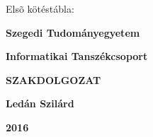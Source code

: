 \documentclass[12pt]{report}
\begin{document}
\thispagestyle{empty}
Elsõ kötéstábla:

\begin{center}
{\Large\bf Szegedi Tudományegyetem}

\vspace{0.5cm}

{\Large\bf Informatikai Tanszékcsoport}

\vspace*{8.5cm}


{\Huge\bf SZAKDOLGOZAT}


\vspace*{7cm}

{\LARGE\bf Ledán Szilárd}

\vspace*{0.6cm}

{\Large\bf 2016}

\end{center}
\end{document}
